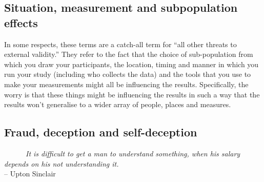 \documentclass[
]{book}
\begin{document}
\hypertarget{situation-measurement-and-subpopulation-effects}{%
\subsection{Situation, measurement and subpopulation effects}\label{situation-measurement-and-subpopulation-effects}}

In some respects, these terms are a catch-all term for ``all other threats to external validity.'' They refer to the fact that the choice of sub-population from which you draw your participants, the location, timing and manner in which you run your study (including who collects the data) and the tools that you use to make your measurements might all be influencing the results. Specifically, the worry is that these things might be influencing the results in such a way that the results won't generalise to a wider array of people, places and measures.

\hypertarget{fraud-deception-and-self-deception}{%
\subsection{Fraud, deception and self-deception}\label{fraud-deception-and-self-deception}}

~~~~~~\emph{It is difficult to get a man to understand something, when his salary depends on his not understanding it.}\\
\hspace*{0.333em}\hspace*{0.333em}\hspace*{0.333em}\hspace*{0.333em}\hspace*{0.333em}\hspace*{0.333em}\hspace*{0.333em}\hspace*{0.333em}\hspace*{0.333em}\hspace*{0.333em}\hspace*{0.333em}\hspace*{0.333em}\hspace*{0.333em}\hspace*{0.333em}\hspace*{0.333em}\hspace*{0.333em}\hspace*{0.333em}\hspace*{0.333em}\hspace*{0.333em}\hspace*{0.333em}\hspace*{0.333em}\hspace*{0.333em}\hspace*{0.333em}\hspace*{0.333em}\hspace*{0.333em}\hspace*{0.333em}\hspace*{0.333em}\hspace*{0.333em}\hspace*{0.333em}\hspace*{0.333em}-- Upton Sinclair
\end{document}
